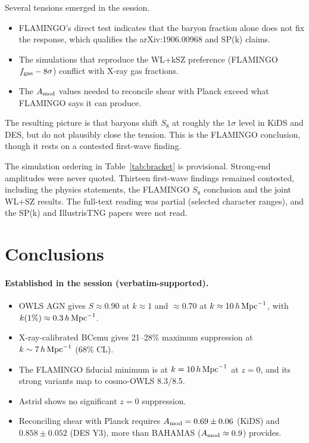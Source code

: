 \documentclass[11pt,a4paper]{article}
\begin{document}
Several tensions emerged in the session.
\begin{itemize}
\item FLAMINGO's direct test indicates that the baryon fraction alone does not fix the response, which qualifies the arXiv:1906.00968 and SP(k) claims.
\item The simulations that reproduce the WL+kSZ preference (FLAMINGO $f_{\rm gas}-8\sigma$) conflict with X-ray gas fractions.
\item The $A_{\rm mod}$ values needed to reconcile shear with Planck exceed what FLAMINGO says it can produce.
\end{itemize}
The resulting picture is that baryons shift $S_8$ at roughly the $1\sigma$ level in KiDS and DES, but do not plausibly close the tension. This is the FLAMINGO conclusion, though it rests on a contested first-wave finding.

The simulation ordering in Table~\ref{tab:bracket} is provisional. Strong-end amplitudes were never quoted. Thirteen first-wave findings remained contested, including the physics statements, the FLAMINGO $S_8$ conclusion and the joint WL+SZ results. The full-text reading was partial (selected character ranges), and the SP(k) and IllustrisTNG papers were not read.

\section{Conclusions}
\paragraph{Established in the session (verbatim-supported).}
\begin{itemize}
\item OWLS AGN gives $S\approx0.90$ at $k\approx1$ and $\approx0.70$ at $k\approx10\,h\,{\rm Mpc}^{-1}$, with $k(1\%)\approx0.3\,h\,{\rm Mpc}^{-1}$.
\item X-ray-calibrated BCemu gives 21--28\% maximum suppression at $k\sim7\,h\,{\rm Mpc}^{-1}$ (68\% CL).
\item The FLAMINGO fiducial minimum is at $k=10\,h\,{\rm Mpc}^{-1}$ at $z=0$, and its strong variants map to cosmo-OWLS 8.3/8.5.
\item Astrid shows no significant $z=0$ suppression.
\item Reconciling shear with Planck requires $A_{\rm mod}=0.69\pm0.06$ (KiDS) and $0.858\pm0.052$ (DES Y3), more than BAHAMAS ($A_{\rm mod}\approx0.9$) provides.
\end{itemize}
\end{document}
